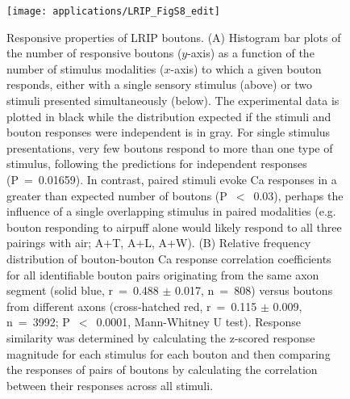 \begin{figure}
{	%
	}
	\label{fig:other:LRIP:imaging}
\end{figure}

\begin{figure}
	\centering
	\texttt{[image: applications/LRIP\_FigS8\_edit]}
	\caption[Responsive properties of LRIP boutons]{Responsive properties of LRIP boutons. (A) Histogram bar plots of the number of responsive boutons ($y$-axis) as a function of the number of stimulus modalities ($x$-axis) to which a given bouton responds, either with a single sensory stimulus (above) or two stimuli presented simultaneously (below). The experimental data is plotted in black while the distribution expected if the stimuli and bouton responses were independent is in gray. For single stimulus presentations, very few boutons respond to more than one type of stimulus, following the predictions for independent responses (P~=~0.01659). In contrast, paired stimuli evoke Ca responses in a greater than expected number of boutons (P~$<$~0.03), perhaps the influence of a single overlapping stimulus in paired modalities (e.g. bouton responding to airpuff alone would likely respond to all three pairings with air; A+T, A+L, A+W).
	(B) Relative frequency distribution of bouton-bouton Ca response correlation coefficients for all identifiable bouton pairs originating from the same axon segment (solid blue, r~=~0.488 $\pm$ 0.017, n~=~808) versus boutons from different axons (cross-hatched red, r~=~0.115 $\pm$ 0.009, n~=~3992; P~$<$~0.0001, Mann-Whitney U test). Response similarity was determined by calculating the z-scored response magnitude for each stimulus for each bouton and then comparing the responses of pairs of boutons by calculating the correlation between their responses across all stimuli.
	}
	\label{fig:other:LRIP:boutons}
\end{figure}

